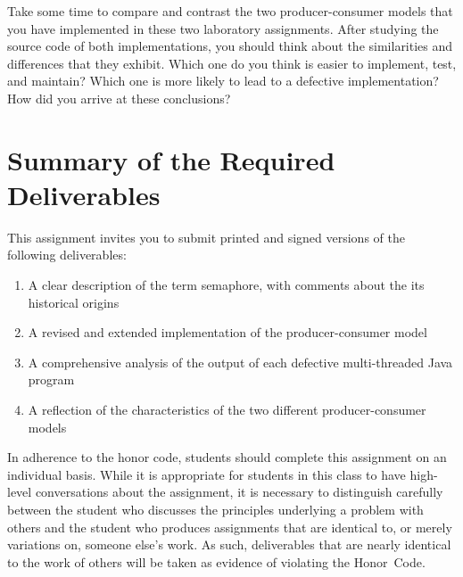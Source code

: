 Take some time to compare and contrast the two producer-consumer models that you have implemented in these two
laboratory assignments. After studying the source code of both implementations, you should think about the similarities
and differences that they exhibit.  Which one do you think is easier to implement, test, and maintain? Which one is more
likely to lead to a defective implementation? How did you arrive at these conclusions?

\section*{Summary of the Required Deliverables}

This assignment invites you to submit printed and signed versions of the following deliverables: 

\begin{enumerate}

  \item A clear description of the term semaphore, with comments about the its historical origins 

  \item A revised and extended implementation of the producer-consumer model

  \item A comprehensive analysis of the output of each defective multi-threaded Java program

  \item A reflection of the characteristics of the two different producer-consumer models

\end{enumerate}

In adherence to the honor code, students should complete this assignment on an individual basis. While it is appropriate
for students in this class to have high-level conversations about the assignment, it is necessary to distinguish
carefully between the student who discusses the principles underlying a problem with others and the student who produces
assignments that are identical to, or merely variations on, someone else's work.  As such, deliverables that are nearly
identical to the work of others will be taken as evidence of violating the \mbox{Honor Code}.  



  
